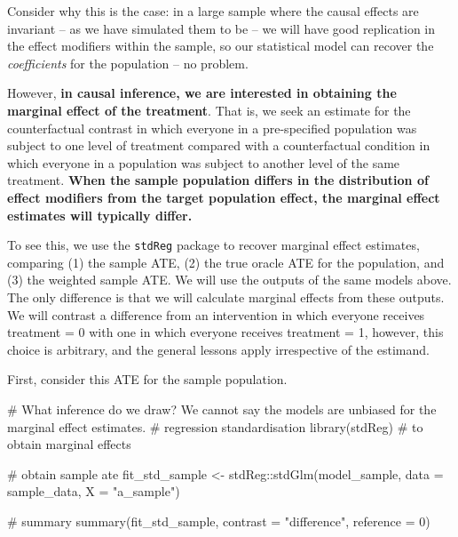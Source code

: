 \documentclass[
  singlecolumn]{article}
\newenvironment{Shaded}{\begin{snugshade}}{\end{snugshade}}
\newcommand{\AttributeTok}[1]{\textcolor[rgb]{0.40,0.45,0.13}{#1}}
\newcommand{\CommentTok}[1]{\textcolor[rgb]{0.37,0.37,0.37}{#1}}
\newcommand{\DecValTok}[1]{\textcolor[rgb]{0.68,0.00,0.00}{#1}}
\newcommand{\FunctionTok}[1]{\textcolor[rgb]{0.28,0.35,0.67}{#1}}
\newcommand{\NormalTok}[1]{\textcolor[rgb]{0.00,0.23,0.31}{#1}}
\newcommand{\OtherTok}[1]{\textcolor[rgb]{0.00,0.23,0.31}{#1}}
\newcommand{\SpecialCharTok}[1]{\textcolor[rgb]{0.37,0.37,0.37}{#1}}
\newcommand{\StringTok}[1]{\textcolor[rgb]{0.13,0.47,0.30}{#1}}
\begin{document}
Consider why this is the case: in a large sample where the causal
effects are invariant -- as we have simulated them to be -- we will have
good replication in the effect modifiers within the sample, so our
statistical model can recover the \emph{coefficients} for the population
-- no problem.

However, \textbf{in causal inference, we are interested in obtaining the
marginal effect of the treatment}. That is, we seek an estimate for the
counterfactual contrast in which everyone in a pre-specified population
was subject to one level of treatment compared with a counterfactual
condition in which everyone in a population was subject to another level
of the same treatment. \textbf{When the sample population differs in the
distribution of effect modifiers from the target population effect, the
marginal effect estimates will typically differ.}

To see this, we use the \texttt{stdReg} package to recover marginal
effect estimates, comparing (1) the sample ATE, (2) the true oracle ATE
for the population, and (3) the weighted sample ATE. We will use the
outputs of the same models above. The only difference is that we will
calculate marginal effects from these outputs. We will contrast a
difference from an intervention in which everyone receives treatment = 0
with one in which everyone receives treatment = 1, however, this choice
is arbitrary, and the general lessons apply irrespective of the
estimand.

First, consider this ATE for the sample population.

\begin{Shaded}
\begin{Highlighting}[]
\CommentTok{\# What inference do we draw?  We cannot say the models are unbiased for the marginal effect estimates. }
\CommentTok{\# regression standardisation }
\FunctionTok{library}\NormalTok{(stdReg) }\CommentTok{\# to obtain marginal effects }


\CommentTok{\# obtain sample ate}
\NormalTok{fit\_std\_sample }\OtherTok{\textless{}{-}}
\NormalTok{  stdReg}\SpecialCharTok{::}\FunctionTok{stdGlm}\NormalTok{(model\_sample, }\AttributeTok{data =}\NormalTok{ sample\_data, }\AttributeTok{X =} \StringTok{"a\_sample"}\NormalTok{)}

\CommentTok{\# summary}
\FunctionTok{summary}\NormalTok{(fit\_std\_sample,}
        \AttributeTok{contrast =} \StringTok{"difference"}\NormalTok{,}
        \AttributeTok{reference =} \DecValTok{0}\NormalTok{)}
\end{Highlighting}
\end{Shaded}
\end{document}
